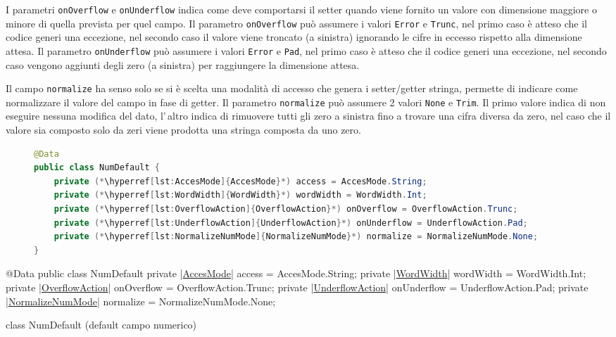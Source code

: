 I parametri \verb!onOverflow! e \verb!onUnderflow! indica come deve comportarsi
il setter quando viene fornito un valore con dimensione maggiore o minore di
quella prevista per quel campo.
Il parametro \verb!onOverflow! può assumere i valori \verb!Error! e 
\verb!Trunc!, nel primo caso è atteso che il codice generi una eccezione,
nel secondo caso il valore viene troncato (a sinistra) ignorando le cifre in
eccesso rispetto alla dimensione attesa.
Il parametro \verb!onUnderflow! può assumere i valori \verb!Error! e \verb!Pad!,
nel primo caso è atteso che il codice generi una eccezione, nel secondo caso
vengono aggiunti degli zero (a sinistra) per raggiungere la dimensione attesa.

Il campo \verb!normalize! ha senso solo se si è scelta una modalità di
accesso che genera i setter/getter stringa, permette di indicare come 
normalizzare il valore del campo in fase di getter.
Il parametro \verb!normalize! può assumere 2 valori \verb!None! e \verb!Trim!. 
Il primo valore indica di non eseguire nessuna modifica del dato,
l'\,altro indica di rimuovere tutti gli zero a sinistra fino a trovare
una cifra diversa da zero, nel caso che il valore sia composto solo da
zeri viene prodotta una stringa composta da uno zero.

\ifesource
\begin{figure*}[!htb]
\begin{lstlisting}[language=java, 
caption=class NumDefault (default campo numerico), 
label=lst:NumDefault]
@Data
public class NumDefault {
    private (*\hyperref[lst:AccesMode]{AccesMode}*) access = AccesMode.String;
    private (*\hyperref[lst:WordWidth]{WordWidth}*) wordWidth = WordWidth.Int;
    private (*\hyperref[lst:OverflowAction]{OverflowAction}*) onOverflow = OverflowAction.Trunc;
    private (*\hyperref[lst:UnderflowAction]{UnderflowAction}*) onUnderflow = UnderflowAction.Pad;
    private (*\hyperref[lst:NormalizeNumMode]{NormalizeNumMode}*) normalize = NormalizeNumMode.None;
}
\end{lstlisting}
\end{figure*}
\else
\begin{elisting}[!htb]
\begin{javacode}
@Data
public class NumDefault {
    private |\hyperref[lst:AccesMode]{AccesMode}| access = AccesMode.String;
    private |\hyperref[lst:WordWidth]{WordWidth}| wordWidth = WordWidth.Int;
    private |\hyperref[lst:OverflowAction]{OverflowAction}| onOverflow = OverflowAction.Trunc;
    private |\hyperref[lst:UnderflowAction]{UnderflowAction}| onUnderflow = UnderflowAction.Pad;
    private |\hyperref[lst:NormalizeNumMode]{NormalizeNumMode}| normalize = NormalizeNumMode.None;
}
\end{javacode}
\caption{class NumDefault (default campo numerico)}
\label{lst:NumDefault}
\end{elisting}
\fi


